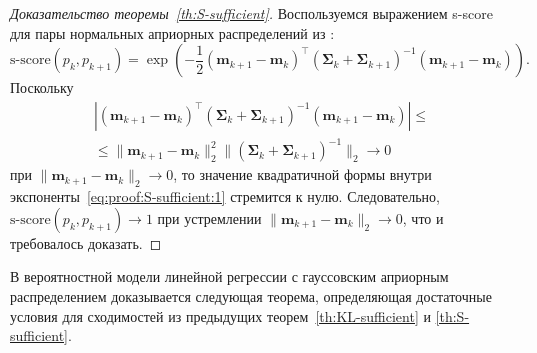 \begin{proof}[Доказательство теоремы~\ref{th:S-sufficient}]
    Воспользуемся выражением s-score для пары нормальных априорных распределений из \cite{Aduenko2017}:
    \begin{equation}
        \text{s-score}(p_k, p_{k+1}) = \exp{\left( -\frac{1}{2} (\mathbf{m}_{k+1} - \mathbf{m}_k)^\top \left( \mathbf{\Sigma}_k + \mathbf{\Sigma}_{k+1} \right)^{-1} (\mathbf{m}_{k+1} - \mathbf{m}_k) \right)}. \label{eq:proof:S-sufficient:1}
    \end{equation}
    Поскольку
    \begin{multline}
        \left| (\mathbf{m}_{k+1} - \mathbf{m}_k)^\top \left( \mathbf{\Sigma}_k + \mathbf{\Sigma}_{k+1} \right)^{-1} (\mathbf{m}_{k+1} - \mathbf{m}_k) \right| \leqslant \\
        \leqslant \| \mathbf{m}_{k+1} - \mathbf{m}_k \|_2^2 \| \left( \mathbf{\Sigma}_k + \mathbf{\Sigma}_{k+1} \right)^{-1} \|_2 \to 0
    \end{multline}
    при $\| \mathbf{m}_{k+1} - \mathbf{m}_k \|_2 \to 0$, то значение квадратичной формы внутри экспоненты~\eqref{eq:proof:S-sufficient:1} стремится к нулю. Следовательно, $\text{s-score}(p_k, p_{k+1}) \to 1$ при устремлении $\| \mathbf{m}_{k+1} - \mathbf{m}_k \|_2 \to 0$, что и требовалось доказать.
\end{proof}

В вероятностной модели линейной регрессии с гауссовским априорным распределением доказывается следующая теорема, определяющая достаточные условия для сходимостей из предыдущих теорем~\ref{th:KL-sufficient} и \ref{th:S-sufficient}.

